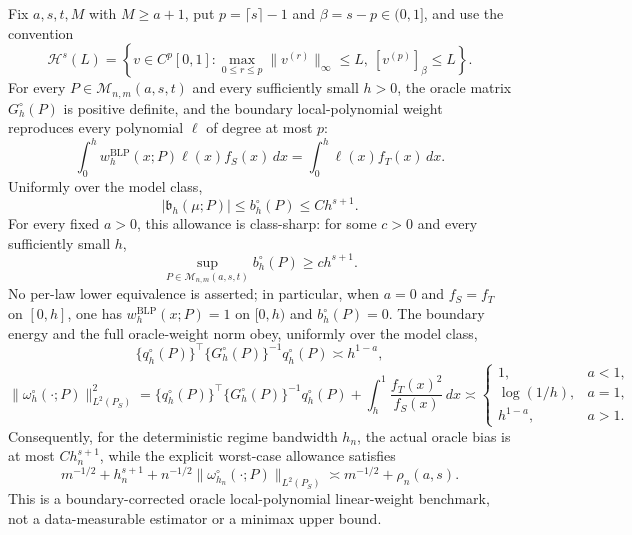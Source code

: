 Fix \(a,s,t,M\) with \(M\ge a+1\), put \(p=\lceil s\rceil-1\) and \(\beta=s-p\in(0,1]\), and use the convention
\[
\mathcal H^s(L)=\left\{v\in C^p[0,1]:
\max_{0\le r\le p}\|v^{(r)}\|_\infty\le L,
\ [v^{(p)}]_{\beta}\le L\right\}.
\]
For every \(P\in\mathcal M_{n,m}(a,s,t)\) and every sufficiently small \(h>0\), the oracle matrix \(G_h^{\circ}(P)\) is positive definite, and the boundary local-polynomial weight reproduces every polynomial \(\ell\) of degree at most \(p\):
\[
\int_0^h w_h^{\mathrm{BLP}}(x;P)\ell(x)f_S(x)\,dx
=\int_0^h\ell(x)f_T(x)\,dx.
\]
Uniformly over the model class,
\[
|\mathfrak b_h(\mu;P)|\le b_h^{\circ}(P)\le C h^{s+1}.
\]
For every fixed \(a>0\), this allowance is class-sharp: for some \(c>0\) and every sufficiently small \(h\),
\[
\sup_{P\in\mathcal M_{n,m}(a,s,t)}b_h^{\circ}(P)\ge c h^{s+1}.
\]
No per-law lower equivalence is asserted; in particular, when \(a=0\) and \(f_S=f_T\) on \([0,h]\), one has \(w_h^{\mathrm{BLP}}(x;P)=1\) on \([0,h)\) and \(b_h^{\circ}(P)=0\). The boundary energy and the full oracle-weight norm obey, uniformly over the model class,
\[
\{q_h^{\circ}(P)\}^\top\{G_h^{\circ}(P)\}^{-1}q_h^{\circ}(P)\asymp h^{1-a},
\]
\[
\|\omega_h^{\circ}(\cdot;P)\|_{L^2(P_S)}^2
=\{q_h^{\circ}(P)\}^\top\{G_h^{\circ}(P)\}^{-1}q_h^{\circ}(P)
+\int_h^1\frac{f_T(x)^2}{f_S(x)}\,dx
\asymp
\begin{cases}
1,&a<1,\\
\log(1/h),&a=1,\\
h^{1-a},&a>1.
\end{cases}
\]
Consequently, for the deterministic regime bandwidth \(h_n\), the actual oracle bias is at most \(C h_n^{s+1}\), while the explicit worst-case allowance satisfies
\[
m^{-1/2}+h_n^{s+1}
+n^{-1/2}\|\omega_{h_n}^{\circ}(\cdot;P)\|_{L^2(P_S)}
\asymp m^{-1/2}+\rho_n(a,s).
\]
This is a boundary-corrected oracle local-polynomial linear-weight benchmark, not a data-measurable estimator or a minimax upper bound.